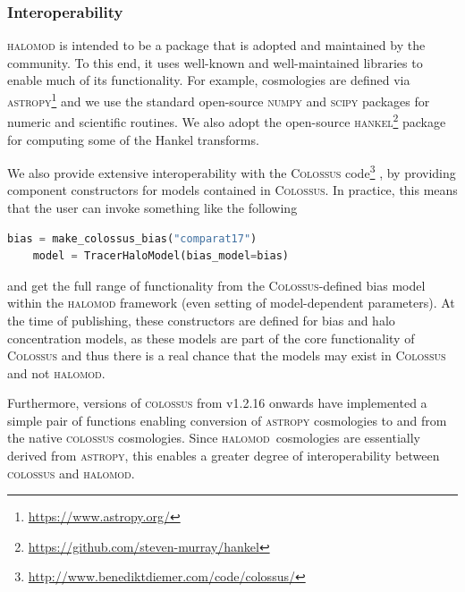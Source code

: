 \documentclass[5p,aas_macros]{elsarticle}
\newcommand{\halomod}{\textsc{halomod}}
\newcommand{\component}{\texttt{Component}}
\begin{document}

\subsubsection{Interoperability}
\textsc{halomod} is intended to be a package that is adopted and maintained by the community. To this end, it uses well-known and well-maintained libraries to enable much of its functionality. 
For example, cosmologies are defined via \textsc{astropy}\footnote{\url{https://www.astropy.org/}} and we use the standard open-source \textsc{numpy} and \textsc{scipy} packages for numeric and scientific routines. 
We also adopt the open-source \textsc{hankel}\footnote{\url{https://github.com/steven-murray/hankel}} \citep{Murray2019} package for computing some of the Hankel transforms.

We also provide extensive interoperability with the \textsc{Colossus} code\footnote{\url{http://www.benediktdiemer.com/code/colossus/}} \citep{Diemer2018}, by providing component constructors for models contained in \textsc{Colossus}. 
In practice, this means that the user can invoke something like the following
%
\begin{lstlisting}[language=Python]
	bias = make_colossus_bias("comparat17")
	model = TracerHaloModel(bias_model=bias)
\end{lstlisting}
and get the full range of functionality from the \textsc{Colossus}-defined bias model within the \textsc{halomod} framework (even setting of model-dependent parameters).
At the time of publishing, these constructors are defined for bias and halo concentration models, as these models are part of the core functionality of \textsc{Colossus} and thus there is a real chance that the models may exist in \textsc{Colossus} and not \textsc{halomod}. 

Furthermore, versions of \textsc{colossus} from v1.2.16 onwards have implemented a simple pair of functions enabling conversion of \textsc{astropy} cosmologies to and from the native \textsc{colossus} cosmologies. 
Since \halomod\ cosmologies are essentially derived from \textsc{astropy}, this enables a greater degree of interoperability between \textsc{colossus}
 and \halomod.
 
\end{document}
